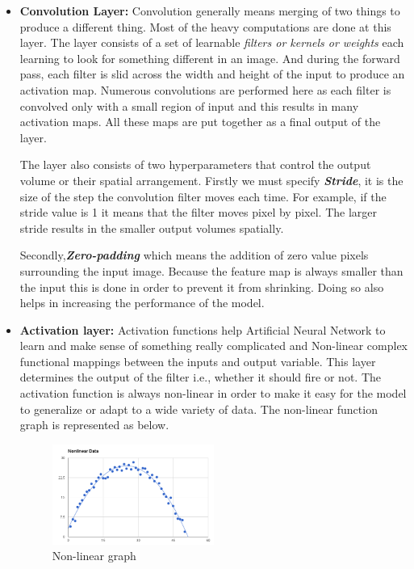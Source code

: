\begin{itemize}
    \item \textbf{Convolution Layer:} Convolution generally means merging of two things to produce a different thing. Most of the heavy computations are done at this layer. The layer consists of a set of learnable \textit{filters or kernels or weights} each learning to look for something different in an image. And during the forward pass, each filter is slid across the width and height of the input to produce an activation map. Numerous convolutions are performed here as each filter is convolved only with a small region of input and this results in many activation maps. All these maps are put together as a final output of the layer.%
    
   The layer also consists of two hyperparameters that control the output volume or their spatial arrangement. Firstly we must specify \textit{\textbf{Stride}}, it is the size of the step the convolution filter moves each time. For example, if the stride value is 1 it means that the filter moves pixel by pixel. The larger stride results in the smaller output volumes spatially.\cite{8308186}
   
 \setlength{\parindent}{10ex} Secondly,\textit{\textbf{Zero-padding}} which means the addition of zero value pixels surrounding the input image. Because the feature map is always smaller than the input this is done in order to prevent it from shrinking. Doing so also helps in increasing the performance of the model.\cite{8308186}
 \item \textbf{Activation layer:} Activation functions help Artificial Neural Network to learn and make sense of something really complicated and Non-linear complex functional mappings between the inputs and output variable. This layer determines the output of the filter i.e., whether it should fire or not. The activation function is always non-linear in order to make it easy for the model to generalize or adapt to a wide variety of data. The non-linear function graph is represented as below.
 \begin{figure}[h]
    \centering
    \includegraphics[width=0.5\textwidth]{thesis_template/images/nonlinear.png}
    \caption{Non-linear graph}
    \label{}
    \end{figure}
 

\end{itemize}
